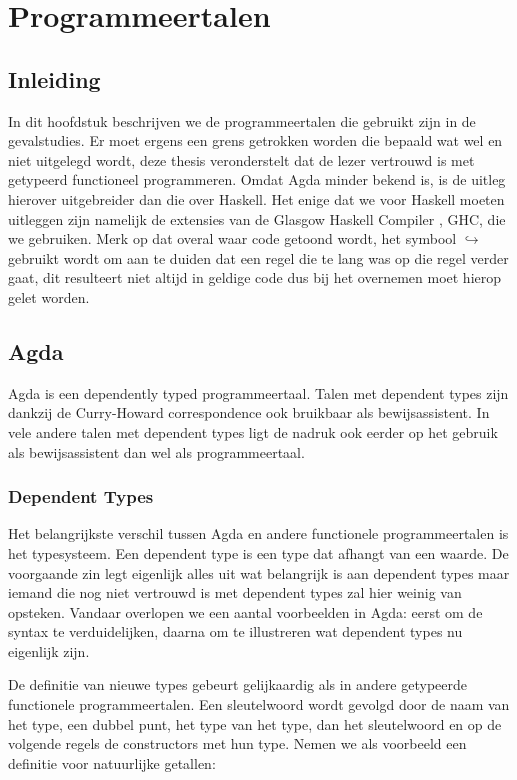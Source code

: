\chapter{Programmeertalen}
\label{ch:agda-haskell}


\section{Inleiding}

In dit hoofdstuk beschrijven we de programmeertalen die gebruikt zijn in de
gevalstudies. Er moet ergens een grens getrokken worden die bepaald wat wel en
niet uitgelegd wordt, deze thesis veronderstelt dat de lezer vertrouwd is met
getypeerd functioneel programmeren. Omdat Agda minder bekend is, is de uitleg
hierover uitgebreider dan die over Haskell. Het enige dat we voor Haskell
moeten uitleggen zijn namelijk de extensies van de Glasgow Haskell Compiler
\cite{ghc}, GHC, die we gebruiken. Merk op dat overal waar code getoond wordt,
het symbool {\tiny\ensuremath{\hookrightarrow}} gebruikt wordt om aan te duiden
dat een regel die te lang was op die regel verder gaat, dit resulteert niet
altijd in geldige code dus bij het overnemen moet hierop gelet worden.


\section{Agda}

Agda is een dependently typed programmeertaal. Talen met dependent types zijn
dankzij de Curry-Howard correspondence ook bruikbaar als bewijsassistent. In
vele andere talen met dependent types ligt de nadruk ook eerder op het gebruik
als bewijsassistent dan wel als programmeertaal.

\subsection{Dependent Types}
\label{sec:indfamagda}

Het belangrijkste verschil tussen Agda en andere functionele programmeertalen
is het typesysteem. Een dependent type is een type dat afhangt van een waarde.
De voorgaande zin legt eigenlijk alles uit wat belangrijk is aan dependent
types maar iemand die nog niet vertrouwd is met dependent types zal hier weinig
van opsteken. Vandaar overlopen we een aantal voorbeelden in Agda: eerst om de
syntax te verduidelijken, daarna om te illustreren wat dependent types nu
eigenlijk zijn.

De definitie van nieuwe types gebeurt gelijkaardig als in andere getypeerde
functionele programmeertalen. Een  sleutelwoord wordt gevolgd door
de naam van het type, een dubbel punt, het type van het type, dan het
sleutelwoord  en op de volgende regels de constructors met hun
type. Nemen we als voorbeeld een definitie voor natuurlijke getallen:

